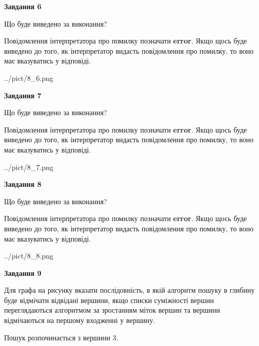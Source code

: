 \documentclass[12pt, ukrainian]{article}
\begin{document}
{\begin {large}
{\begin {center}\textbf{Завдання 6}\end {center}}\par
Що буде виведено за виконання?

Повідомлення інтерпретатора про помилку позначати \textbf{error}.
Якщо щось буде виведено до того, як інтерпретатор видасть повідомлення про помилку, 
то воно має вказуватись у відповіді. \par


\begin{center}
	{../pict/8_6.png}
\end{center}
\newpage

{\begin {center}\textbf{Завдання 7}\end {center}}\par
Що буде виведено за виконання?

Повідомлення інтерпретатора про помилку позначати \textbf{error}.
Якщо щось буде виведено до того, як інтерпретатор видасть повідомлення про помилку, 
то воно має вказуватись у відповіді. \par


\begin{center}
	{../pict/8_7.png}
\end{center}
\newpage

{\begin {center}\textbf{Завдання 8}\end {center}}\par
Що буде виведено за виконання?

Повідомлення інтерпретатора про помилку позначати \textbf{error}.
Якщо щось буде виведено до того, як інтерпретатор видасть повідомлення про помилку, 
то воно має вказуватись у відповіді. \par


\begin{center}
	{../pict/8_8.png}
\end{center}
\newpage

{\begin {center}\textbf{Завдання 9}\end {center}}\par
Для графа на рисунку вказати послідовність, в якій алгоритм пошуку в глибину буде відмічати відвідані вершини, якщо списки суміжності вершин переглядаються алгоритмом за зростанням міток вершин та вершини відмічаються на першому вход\-женні у вершину.\par
Пошук розпочинається з вершини 3.\par


\end{large}}
\end{document}
